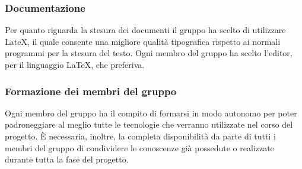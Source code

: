 \subsubsection{Documentazione}
Per quanto riguarda la stesura dei documenti il gruppo ha scelto di utilizzare LateX, il quale consente una migliore qualità tipografica rispetto ai normali programmi per la stesura del testo.
Ogni membro del gruppo ha scelto l'editor, per il linguaggio LaTeX, che preferiva.
\subsubsection{Formazione dei membri del gruppo}
Ogni membro del gruppo ha il compito di formarsi in modo autonomo per poter padroneggiare al meglio tutte le tecnologie che verranno utilizzate nel corso del progetto.
È necessaria, inoltre, la completa disponibilità da parte di tutti i membri del gruppo di condividere le conoscenze già possedute o realizzate durante tutta la fase del progetto.